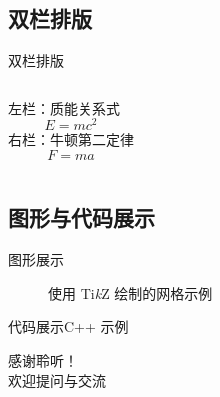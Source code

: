 \documentclass[10pt,aspectratio=169]{beamer}
\begin{document}
\subsection{双栏排版}
\begin{frame}[c]{双栏排版}
  \begin{columns}[onlytextwidth]
      左栏：质能关系式
      \begin{equation}
        E = mc^2
      \end{equation}
      右栏：牛顿第二定律
      \begin{equation}
        F = ma
      \end{equation}
  \end{columns}
\end{frame}

\subsection[图形与代码]{图形与代码展示}
\begin{frame}[c]{图形展示}
  \begin{figure}
    \centering
    \caption{使用 Ti\textit{k}Z 绘制的网格示例}
  \end{figure}
\end{frame}

\begin{frame}{代码展示}{C++ 示例}
  \lstI
\end{frame}

\begin{frame}[plain]
  \vfill
  \centering
  {\Huge\color{white} 感谢聆听！\\[10pt]欢迎提问与交流}
  \vfill
\end{frame}
\end{document}
